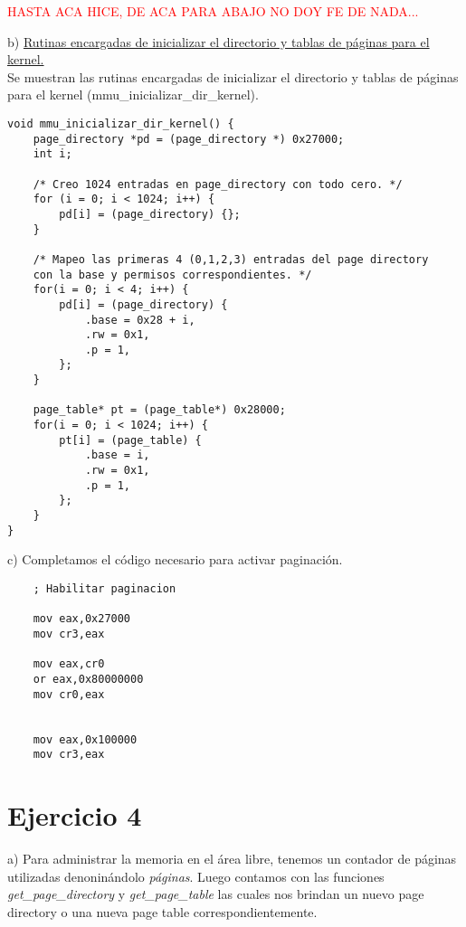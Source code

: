 \documentclass[a4paper]{article}
\begin{document}
\textcolor{red}{HASTA ACA HICE, DE ACA PARA ABAJO NO DOY FE DE NADA...}

{\large b)} \underline{Rutinas encargadas de inicializar el directorio y tablas de p\'aginas para el kernel.}\\


Se muestran las rutinas encargadas de inicializar el directorio y tablas de p\'aginas para el kernel
(mmu_inicializar_dir_kernel). 

\begin{codesnippet}
\begin{verbatim}
void mmu_inicializar_dir_kernel() {
    page_directory *pd = (page_directory *) 0x27000;
    int i;

    /* Creo 1024 entradas en page_directory con todo cero. */
    for (i = 0; i < 1024; i++) {
        pd[i] = (page_directory) {};
    }

    /* Mapeo las primeras 4 (0,1,2,3) entradas del page directory
    con la base y permisos correspondientes. */
    for(i = 0; i < 4; i++) {
        pd[i] = (page_directory) {
            .base = 0x28 + i,
            .rw = 0x1,
            .p = 1,
        };
    }

    page_table* pt = (page_table*) 0x28000;
    for(i = 0; i < 1024; i++) {
        pt[i] = (page_table) {
            .base = i,
            .rw = 0x1,
            .p = 1,
        };
    }
}
\end{verbatim}
\end{codesnippet}



{\large c)} Completamos el c\'odigo necesario para activar paginaci\'on.\\

\begin{codesnippet}
\begin{verbatim}
    ; Habilitar paginacion

    mov eax,0x27000
    mov cr3,eax

    mov eax,cr0
    or eax,0x80000000
    mov cr0,eax


    mov eax,0x100000
    mov cr3,eax
\end{verbatim}
\end{codesnippet}

\newpage
\section{Ejercicio 4}
{\large a)} Para administrar la memoria en el área libre, tenemos un contador de páginas utilizadas denoninándolo \textit{páginas}. Luego contamos con las funciones \textit{get_page_directory} y \textit{get_page_table} las cuales nos brindan un nuevo page directory o una nueva page table correspondientemente.
\end{document}
